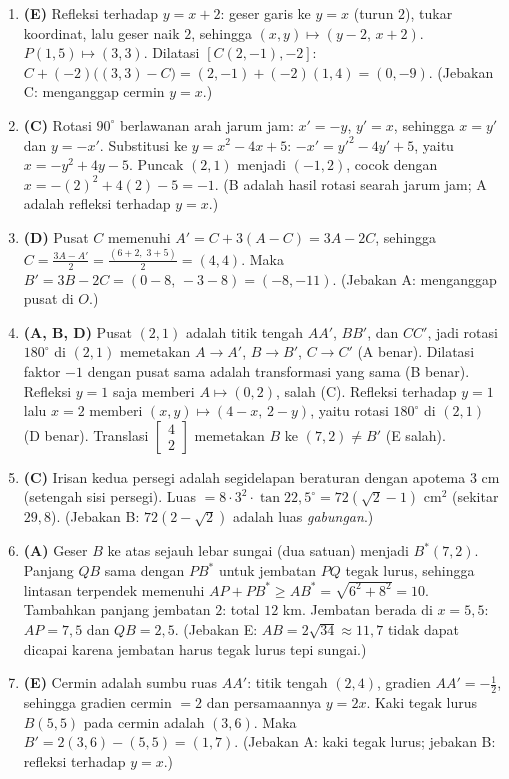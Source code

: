 \documentclass[a4paper,11pt]{article}
\newcommand{\sm}[1]{\left[\begin{smallmatrix}#1\end{smallmatrix}\right]}
\begin{document}
\begin{enumerate}[leftmargin=2em,itemsep=2pt,topsep=2pt]
\item[\textbf{11.}] \textbf{(E)} Refleksi terhadap $y=x+2$: geser garis ke $y=x$ (turun $2$), tukar koordinat, lalu geser naik $2$, sehingga $(x,y)\mapsto(y-2,\,x+2)$. $P(1,5)\mapsto(3,3)$. Dilatasi $[C(2,-1),-2]$: $C+(-2)\big((3,3)-C\big)=(2,-1)+(-2)(1,4)=(0,-9)$. (Jebakan C: menganggap cermin $y=x$.)
\item[\textbf{12.}] \textbf{(C)} Rotasi $90^\circ$ berlawanan arah jarum jam: $x'=-y$, $y'=x$, sehingga $x=y'$ dan $y=-x'$. Substitusi ke $y=x^2-4x+5$: $-x'=y'^2-4y'+5$, yaitu $x=-y^2+4y-5$. Puncak $(2,1)$ menjadi $(-1,2)$, cocok dengan $x=-(2)^2+4(2)-5=-1$. (B adalah hasil rotasi searah jarum jam; A adalah refleksi terhadap $y=x$.)
\item[\textbf{13.}] \textbf{(D)} Pusat $C$ memenuhi $A'=C+3(A-C)=3A-2C$, sehingga $C=\frac{3A-A'}{2}=\frac{(6+2,\;3+5)}{2}=(4,4)$. Maka $B'=3B-2C=(0-8,\,-3-8)=(-8,-11)$. (Jebakan A: menganggap pusat di $O$.)
\item[\textbf{14.}] \textbf{(A, B, D)} Pusat $(2,1)$ adalah titik tengah $AA'$, $BB'$, dan $CC'$, jadi rotasi $180^\circ$ di $(2,1)$ memetakan $A\to A'$, $B\to B'$, $C\to C'$ (A benar). Dilatasi faktor $-1$ dengan pusat sama adalah transformasi yang sama (B benar). Refleksi $y=1$ saja memberi $A\mapsto(0,2)$, salah (C). Refleksi terhadap $y=1$ lalu $x=2$ memberi $(x,y)\mapsto(4-x,\,2-y)$, yaitu rotasi $180^\circ$ di $(2,1)$ (D benar). Translasi $\sm{4\\2}$ memetakan $B$ ke $(7,2)\neq B'$ (E salah).
\item[\textbf{15.}] \textbf{(C)} Irisan kedua persegi adalah segidelapan beraturan dengan apotema $3$ cm (setengah sisi persegi). Luas $=8\cdot3^2\cdot\tan22{,}5^\circ=72(\sqrt2-1)$ cm$^2$ (sekitar $29{,}8$). (Jebakan B: $72(2-\sqrt2)$ adalah luas \emph{gabungan}.)
\item[\textbf{16.}] \textbf{(A)} Geser $B$ ke atas sejauh lebar sungai (dua satuan) menjadi $B^*(7,2)$. Panjang $QB$ sama dengan $PB^*$ untuk jembatan $PQ$ tegak lurus, sehingga lintasan terpendek memenuhi $AP+PB^*\ge AB^*=\sqrt{6^2+8^2}=10$. Tambahkan panjang jembatan $2$: total $12$ km. Jembatan berada di $x=5{,}5$: $AP=7{,}5$ dan $QB=2{,}5$. (Jebakan E: $AB=2\sqrt{34}\approx11{,}7$ tidak dapat dicapai karena jembatan harus tegak lurus tepi sungai.)
\item[\textbf{17.}] \textbf{(E)} Cermin adalah sumbu ruas $AA'$: titik tengah $(2,4)$, gradien $AA'=-\frac12$, sehingga gradien cermin $=2$ dan persamaannya $y=2x$. Kaki tegak lurus $B(5,5)$ pada cermin adalah $(3,6)$. Maka $B'=2(3,6)-(5,5)=(1,7)$. (Jebakan A: kaki tegak lurus; jebakan B: refleksi terhadap $y=x$.)

\end{enumerate}
\end{document}
